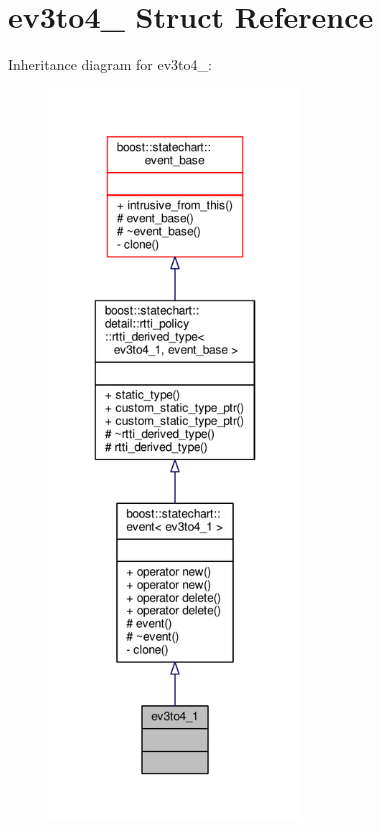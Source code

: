 \hypertarget{structev3to4__1}{}\section{ev3to4\+\_ Struct Reference}
\label{structev3to4__1}


Inheritance diagram for ev3to4\+\_\+:
\nopagebreak
\begin{figure}[H]
\begin{center}
\leavevmode
\includegraphics[height=550pt]{structev3to4__1__inherit__graph}
\end{center}
\end{figure}


